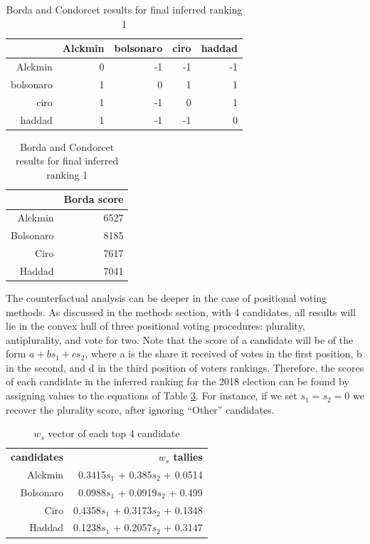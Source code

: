 \documentclass[hidelinks,11pt]{article}
\begin{document}
\begin{table}[h]
\begin{subtable}[h]{0.4\textwidth}
\centering
\begin{tabular}{rrrrr}
  \hline
 & Alckmin & bolsonaro & ciro & haddad \\
  \hline
Alckmin & 0 & -1 & -1 & -1 \\
  bolsonaro & 1 & 0 & 1 & 1 \\
  ciro & 1 & -1 & 0 & 1 \\
  haddad & 1 & -1 & -1 & 0 \\
   \hline
\end{tabular}
\caption{Pairwise Majority Comparisons}
\label{tbl:subtab1}
\end{subtable}
\hfill
\begin{subtable}[h]{0.4\textwidth}
  \centering
\begin{tabular}{rr}
  \hline
 & Borda score \\
  \hline
Alckmin & 6527 \\
  Bolsonaro & 8185 \\
  Ciro & 7617 \\
  Haddad & 7041 \\
   \hline
\end{tabular}
\caption{Borda scores}
\label{tbl:subtab2}
\end{subtable}
\caption{Borda and Condorcet results for final inferred ranking 1}
\label{tbl:tab1}
\end{table}


The counterfactual analysis can be deeper in the case of positional voting
methods. As discussed in the methods section, with 4 candidates, all results will
lie in the convex hull of three positional voting procedures: plurality,
antiplurality, and vote for two. Note that the score of a candidate will be of the
form \(a + bs_{1} + cs_{2}\), where a is the share it received of votes in the
first position, b in the second, and d in the third position of voters rankings.
Therefore, the scores of each candidate in the inferred ranking for the 2018 election can be found by assigning values to the equations of Table
\ref{tab:ws}. For instance, if we set \(s_{1} = s_{2} = 0\) we recover the
plurality score, after ignoring ``Other'' candidates.

\begin{table}
  \centering
  \begin{tabular}{rr}
    \hline\hline
    \textbf{candidates} & \textbf{\(w_s\) tallies} \\
    Alckmin & 0.3415\(s_1\) + 0.385\(s_2\) + 0.0514 \\
    Bolsonaro & 0.0988\(s_1\) + 0.0919\(s_2\) + 0.499 \\
    Ciro & 0.4358\(s_1\) + 0.3173\(s_2\) + 0.1348 \\
    Haddad & 0.1238\(s_1\) + 0.2057\(s_2\) + 0.3147 \\\hline\hline
  \end{tabular}
  \caption{\(w_{s}\) vector of each top 4 candidate}
  \label{tab:ws}
\end{table}
\end{document}
